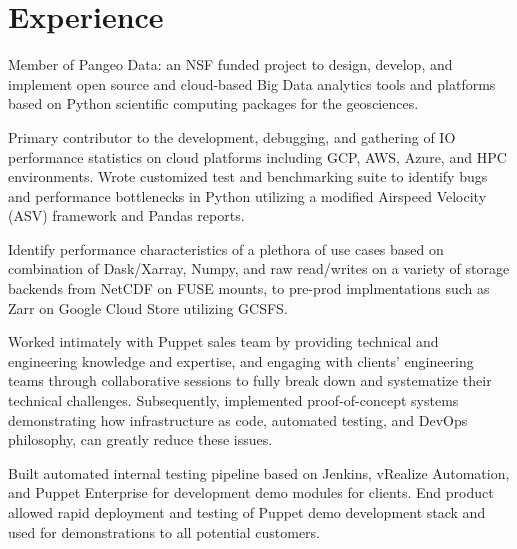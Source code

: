 \documentclass[]{deedy-resume-openfont}
\begin{document}
\begin{minipage}[t]{0.66\textwidth} 


\section{Experience}

\vspace{\topsep} %
\begin{tightemize}
    \item Member of Pangeo Data: an NSF funded project to design, develop, and implement open source and cloud-based Big Data analytics tools and platforms based on Python scientific computing packages for the geosciences.
    \item Primary contributor to the development, debugging, and gathering of IO performance statistics on cloud platforms including GCP, AWS, Azure, and HPC environments. Wrote customized test and benchmarking suite to identify bugs and performance bottlenecks in Python utilizing a modified Airspeed Velocity (ASV) framework and Pandas reports.
    \item Identify performance characteristics of a plethora of use cases based on combination of Dask/Xarray, Numpy, and raw read/writes on a variety of storage backends from NetCDF on FUSE mounts, to pre-prod implmentations such as Zarr on Google Cloud Store utilizing GCSFS.
\end{tightemize}
\sectionsep

\begin{tightemize}
\item  Worked intimately with Puppet sales team by providing technical and engineering knowledge and expertise, and engaging with clients' engineering teams through collaborative sessions to fully break down and systematize their technical challenges. Subsequently, implemented proof-of-concept systems demonstrating how infrastructure as code, automated testing, and DevOps philosophy, can greatly reduce these issues.
\item Built automated internal testing pipeline based on Jenkins, vRealize Automation, and Puppet Enterprise for development demo modules for clients. End product allowed rapid deployment and testing of Puppet demo development stack and used for demonstrations to all potential customers.\end{tightemize}
\sectionsep


\end{minipage}
\end{document}
